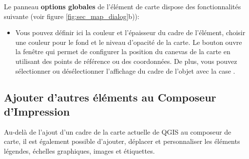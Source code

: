 
Le panneau \textbf{options globales} de l'élément de carte dispose des fonctionnalités suivante (voir figure \ref{fig:sec_map_dialog}b)):

\begin{itemize}[label=--]
\item Vous pouvez définir ici la couleur et l'épaisseur du cadre de l'élément, choisir une couleur pour le fond et le niveau d'opacité de la carte. Le bouton  ouvre la fenêtre  qui permet de configurer la position du canevas de la carte en utilisant des points de référence ou des coordonnées. De plus, vous pouvez sélectionner ou désélectionner l'affichage du cadre de l'objet avec la case . 
\end{itemize}

\subsection{Ajouter d'autres éléments au Composeur d'Impression}

Au-delà de l'ajout d'un cadre de la carte actuelle de QGIS au composeur de carte, il est également possible d'ajouter, déplacer et personnaliser les
éléments légendes, échelles graphiques, images et étiquettes.

